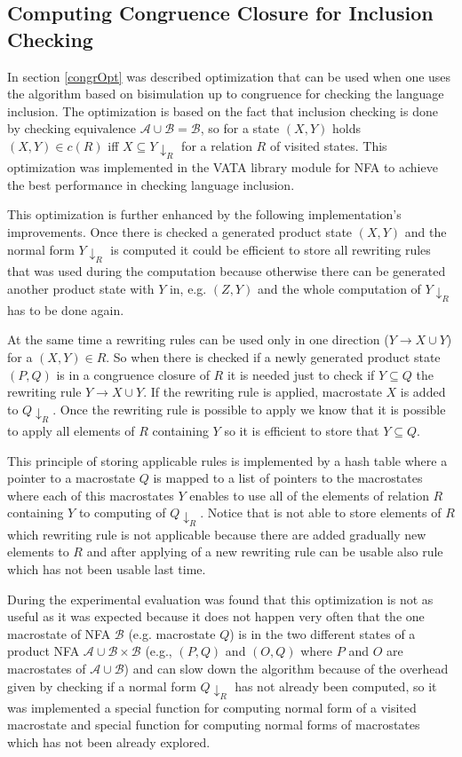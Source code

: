\subsection{Computing Congruence Closure for Inclusion Checking}
In section \ref{congrOpt} was described optimization that can be used when one uses the algorithm based on bisimulation up to congruence for checking 
the language inclusion. The optimization is based on the fact that inclusion checking is done by checking equivalence $\mathcal{A}\cup\mathcal{B}=\mathcal{B}$,
so for a state $(X,Y)$ holds $(X,Y)\in c(R)$ iff $X\subseteq Y{\downarrow_R}$ for a relation $R$ of visited states. 
This optimization was implemented in the VATA library module for NFA to achieve the best performance in checking language inclusion.

This optimization is further enhanced by the following implementation's improvements. Once there is checked a generated product state $(X,Y)$ and the normal form 
$Y{\downarrow_R}$ is computed it could be efficient to store all rewriting rules that was used during the computation because otherwise there can be
generated another product state with $Y$ in, e.g. $(Z,Y)$ and the whole computation of $Y{\downarrow_R}$ has to be done again. 

At the same time a rewriting rules can be used only in one direction ($Y\rightarrow X\cup Y$) for a $(X,Y)\in R$. So when there is checked
if a newly generated product state $(P,Q)$ is in a congruence closure of $R$ it is needed just to check if $Y \subseteq Q$ 
the rewriting rule $Y\rightarrow X\cup Y$. If the rewriting rule is applied, macrostate $X$ is added to $Q{\downarrow_R}$. 
Once the rewriting rule is possible to apply we know that it is possible to apply all elements of $R$ containing $Y$ 
so it is efficient to store that $Y\subseteq Q$.

This principle of storing applicable rules is implemented by a hash table where a pointer to a macrostate $Q$ is mapped to
a list of pointers to the macrostates where each of this macrostates $Y$ enables to use all of the elements of relation $R$ containing $Y$ 
to computing of $Q{\downarrow_R}$.
Notice that is not able to store elements of $R$ which rewriting rule is not applicable because there are added gradually
new elements to $R$ and after applying of a new rewriting rule can be usable also rule which has not been usable last time.%

During the experimental evaluation was found that this optimization is not as useful as it was expected because it does not happen very often that the one
macrostate of NFA $\mathcal{B}$ (e.g. macrostate $Q$) is in the two different states of a product NFA $\mathcal{A}\cup\mathcal{B}\times\mathcal{B}$ (e.g., $(P,Q)$
and $(O,Q)$ where $P$ and $O$ are macrostates of $\mathcal{A}\cup\mathcal{B}$) and can slow down the algorithm because of the overhead given by checking
if a normal form $Q{\downarrow_R}$ has not already been computed, so it was implemented a special function for computing normal form of a visited macrostate 
and special function for computing normal forms of macrostates which has not been already explored. 

